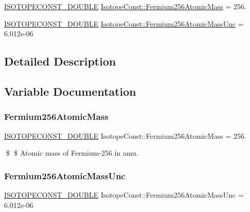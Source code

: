 \begin{DoxyCompactItemize}
\item 
\mbox{\hyperlink{group___isotope_const-_macros_ga8f45a7272ce02c0b4c65c44636ed719a}{I\+S\+O\+T\+O\+P\+E\+C\+O\+N\+S\+T\+\_\+\+D\+O\+U\+B\+LE}} \mbox{\hyperlink{group___isotope_const-_fermium-_fm256_gafd3741253d4ddfad6133cc317d0f3f87}{Isotope\+Const\+::\+Fermium256\+Atomic\+Mass}} = 256.
\item 
\mbox{\hyperlink{group___isotope_const-_macros_ga8f45a7272ce02c0b4c65c44636ed719a}{I\+S\+O\+T\+O\+P\+E\+C\+O\+N\+S\+T\+\_\+\+D\+O\+U\+B\+LE}} \mbox{\hyperlink{group___isotope_const-_fermium-_fm256_ga81488634e6daafb6cad6fdac892060af}{Isotope\+Const\+::\+Fermium256\+Atomic\+Mass\+Unc}} = 6.\+012e-\/06
\end{DoxyCompactItemize}


\subsection{Detailed Description}


\subsection{Variable Documentation}
\mbox{\label{group___isotope_const-_fermium-_fm256_gafd3741253d4ddfad6133cc317d0f3f87}} 
\subsubsection{\texorpdfstring{Fermium256\+Atomic\+Mass}{Fermium256AtomicMass}}
{\footnotesize\ttfamily \mbox{\hyperlink{group___isotope_const-_macros_ga8f45a7272ce02c0b4c65c44636ed719a}{I\+S\+O\+T\+O\+P\+E\+C\+O\+N\+S\+T\+\_\+\+D\+O\+U\+B\+LE}} Isotope\+Const\+::\+Fermium256\+Atomic\+Mass = 256.}

\$ \$ Atomic mass of Fermium-\/256 in amu. \mbox{\label{group___isotope_const-_fermium-_fm256_ga81488634e6daafb6cad6fdac892060af}} 
\subsubsection{\texorpdfstring{Fermium256\+Atomic\+Mass\+Unc}{Fermium256AtomicMassUnc}}
{\footnotesize\ttfamily \mbox{\hyperlink{group___isotope_const-_macros_ga8f45a7272ce02c0b4c65c44636ed719a}{I\+S\+O\+T\+O\+P\+E\+C\+O\+N\+S\+T\+\_\+\+D\+O\+U\+B\+LE}} Isotope\+Const\+::\+Fermium256\+Atomic\+Mass\+Unc = 6.\+012e-\/06}

